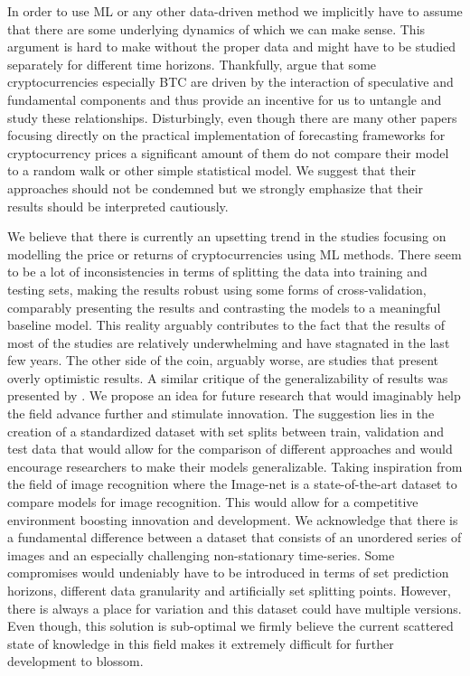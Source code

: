 In order to use \ac{ML} or any other data-driven method we implicitly have to 
assume that there are some underlying dynamics of which we can make sense. 
This argument is hard to make without the proper data and might have to be 
studied separately for different time horizons. Thankfully, \cite{Kukacka2023}
argue that some cryptocurrencies especially \ac{BTC} are driven by the interaction of
speculative and fundamental components and thus provide an incentive for us 
to untangle and study these relationships. Disturbingly, even though 
there are many other papers focusing directly on the practical implementation of 
forecasting frameworks for cryptocurrency prices a significant amount of them
do not compare their model to a random walk or other simple statistical model.
We suggest that their approaches should not be condemned but we 
strongly emphasize 
that their results should be interpreted cautiously.

We believe that there is currently an upsetting trend in the studies
focusing on modelling the price or returns of cryptocurrencies using \ac{ML} methods.
There seem to be a lot of inconsistencies in terms of splitting the data
into training and testing sets, making the results robust using some forms 
of cross-validation, comparably presenting the results and 
contrasting the models to a meaningful baseline model. 
This reality arguably contributes to the fact that the results of most of the studies 
are relatively underwhelming and have stagnated in the last few years.
The other side of the coin, arguably worse, are studies that 
present overly optimistic results. A similar critique 
of the generalizability of results was presented by \cite{Akyildirim2020}.
We propose an idea for future research that would imaginably help the field
advance further and stimulate innovation. The suggestion lies in the creation
of a standardized dataset with set splits between train, validation and test data
that would allow for the comparison of different approaches and would
encourage researchers to make their models generalizable. Taking inspiration
from the field of image recognition where the Image-net is a state-of-the-art dataset
to compare models for image recognition. This would allow for a competitive 
environment boosting innovation and development.
We acknowledge that there is a fundamental difference between a dataset
that consists of an unordered series of images and an especially challenging
non-stationary time-series.
Some compromises would undeniably have to be introduced in terms of 
set prediction horizons, different data granularity and artificially set splitting points.
However, there is always a place for variation and this dataset 
could have multiple versions. Even though, this solution is sub-optimal 
we firmly believe the current scattered state of knowledge in this field 
makes it extremely difficult for further development to blossom.


